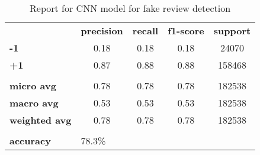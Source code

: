\begin{table}[h!]
	\centering
	\begin{tabular}{lcccc}
		\rowcolor[HTML]{EEEEEE} 
		\cellcolor[HTML]{FBFBFB} & \textbf{precision} & \textbf{recall} & \textbf{f1-score} & \textbf{support} \\
		\rowcolor[HTML]{EEEEEE} 
		\textbf{-1}              & 0.18               & 0.18            & 0.18              & 24070            \\
		\rowcolor[HTML]{EEEEEE} 
		\textbf{+1}              & 0.87               & 0.88            & 0.88              & 158468           \\
		\rowcolor[HTML]{FBFBFB} 
		&                    &                 &                   &                  \\
		\rowcolor[HTML]{EEEEEE} 
		\textbf{micro avg}       & 0.78               & 0.78            & 0.78              & 182538           \\
		\rowcolor[HTML]{EEEEEE} 
		\textbf{macro avg}       & 0.53               & 0.53            & 0.53              & 182538           \\
		\rowcolor[HTML]{EEEEEE} 
		\textbf{weighted avg}    & 0.78               & 0.78            & 0.78              & 182538           \\
		\rowcolor[HTML]{FBFBFB} 
		&                    &                 &                   &                  \\
		\rowcolor[HTML]{EEEEEE} 
		\textbf{accuracy}        & \multicolumn{4}{l}{\cellcolor[HTML]{EEEEEE}78.3\%}                         
	\end{tabular}
	\caption{Report for CNN model for fake review detection}
	\label{tab:cnn-fake-rev}
\end{table}

